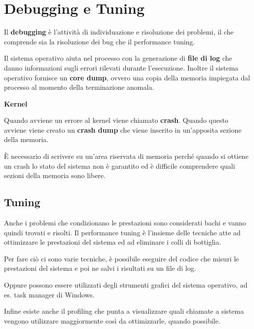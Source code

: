 \section{Debugging e Tuning}
Il \textbf{debugging} è l'attività di individuazione e risoluzione dei problemi, il che comprende sia la risoluzione dei bug che il performance tuning.

\spacer
Il sistema operativo aiuta nel processo con la generazione di \textbf{file di log} che danno informazioni sugli errori rilevati durante l'esecuzione.
Inoltre il sistema operativo fornisce un \textbf{core dump}, ovvero una copia della memoria impiegata dal processo al momento della terminazione anomala.

\begin{note}
    \textbf{Kernel}

    Quando avviene un errore al kernel viene chiamato \textbf{crash}. Quando questo avviene viene creato un \textbf{crash dump} che viene inserito in un'apposita sezione della memoria.

    \spacer
    È necessario di scrivere su un'area riservata di memoria perché quando si ottiene un crash lo stato del sistema non è garantito ed è difficile comprendere quali sezioni della memoria sono libere.
\end{note}

\subsection{Tuning}
Anche i problemi che condizionano le prestazioni sono considerati bachi e vanno quindi trovati e risolti.
Il performance tuning è l'insieme delle tecniche atte ad ottimizzare le prestazioni del sistema ed ad eliminare i colli di bottiglia.

\spacer
Per fare ciò ci sono varie tecniche, è possibile eseguire del codice che misuri le prestazioni del sistema e poi ne salvi i risultati su un file di log.

Oppure possono essere utilizzati degli strumenti grafici del sistema operativo, ad es. task manager di Windows.

Infine esiste anche il profiling che punta a visualizzare quali chiamate a sistema vengono utilizzare maggiormente così da ottimizzarle, quando possibile.